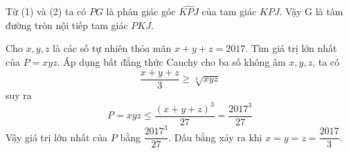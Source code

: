 \begin{ex}
{{\begin{enumerate}
        Từ (1) và (2) ta có $PG$ là phân giác góc $\widehat{KPJ}$ của tam giác $KPJ$. Vậy G là tâm đường tròn nội tiếp tam giác $PKJ$.
    \end{enumerate}
    }{
   
   }
    }
\end{ex}

\begin{ex} %
    Cho $x,y,z$ là các số tự nhiên thỏa mãn $x+y+z=2017$. Tìm giá trị lớn nhất của $P=xyz$.
\loigiai
    {
    Áp dụng bất đẳng thức Cauchy cho ba số không âm $x,y,z$, ta có 
    $$\dfrac{x+y+z}{3} \ge \sqrt[3]{xyz}$$
suy ra     $$P=xyz \le \dfrac{(x+y+z)^3}{27}=\dfrac{2017^3}{27}$$
Vậy giá trị lớn nhất của $P$ bằng $\dfrac{2017^3}{27}$. Dấu bằng xảy ra khi $x=y=z=\dfrac{2017}{3}$.
    }
\end{ex}


